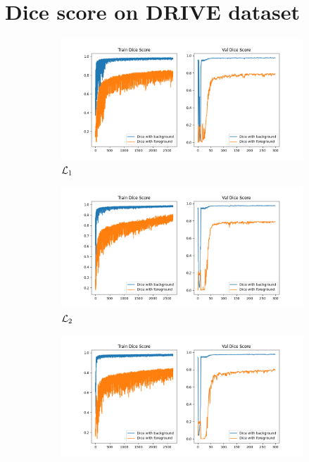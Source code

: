 \section{Dice score on DRIVE dataset}

\begin{figure}[h!]
    \centering
    \begin{subfigure}{0.45\textwidth}
        \includegraphics[width=\textwidth]{figures/dice_coeff_training.png}
        \caption{$\mathcal{L}_1$}
    \end{subfigure}
    \begin{subfigure}{0.45\textwidth}
        \includegraphics[width=\textwidth]{figures/GDL_dice_coeff_training.png}
        \caption{$\mathcal{L}_2$}
    \end{subfigure}
    \begin{subfigure}{0.45\textwidth}
        \includegraphics[width=\textwidth]{figures/CE_dice_coeff_training.png}

\end{subfigure}
\end{figure}
